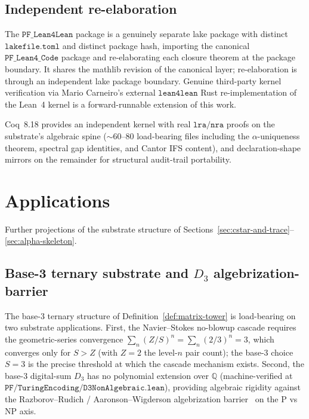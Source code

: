 \documentclass[11pt,a4paper]{amsart}
\theoremstyle{plain}
\theoremstyle{definition}
\begin{document}
\subsection{Independent re-elaboration}

The $\texttt{PF\_Lean4Lean}$ package is a genuinely separate lake package with distinct $\texttt{lakefile.toml}$ and distinct package hash, importing the canonical $\texttt{PF\_Lean4\_Code}$ package and re-elaborating each closure theorem at the package boundary. It shares the mathlib revision of the canonical layer; re-elaboration is through an independent lake package boundary. Genuine third-party kernel verification via Mario Carneiro's external $\texttt{lean4lean}$ Rust re-implementation of the Lean~4 kernel is a forward-runnable extension of this work.

Coq~8.18 provides an independent kernel with real $\texttt{lra}/\texttt{nra}$ proofs on the substrate's algebraic spine ($\sim 60$--$80$ load-bearing files including the $\alpha$-uniqueness theorem, spectral gap identities, and Cantor IFS content), and declaration-shape mirrors on the remainder for structural audit-trail portability.

\section{Applications}\label{sec:applications}

Further projections of the substrate structure of Sections~\ref{sec:cstar-and-trace}--\ref{sec:alpha-skeleton}.

\subsection{Base-3 ternary substrate and $D_{3}$ algebrization-barrier}

The base-3 ternary structure of Definition~\ref{def:matrix-tower} is load-bearing on two substrate applications. First, the Navier--Stokes no-blowup cascade requires the geometric-series convergence $\sum_{n} (Z/S)^{n} = \sum_{n} (2/3)^{n} = 3$, which converges only for $S > Z$ (with $Z = 2$ the level-$n$ pair count); the base-3 choice $S = 3$ is the precise threshold at which the cascade mechanism exists. Second, the base-3 digital-sum $D_{3}$ has no polynomial extension over $\mathbb{Q}$ (machine-verified at $\texttt{PF/TuringEncoding/D3NonAlgebraic.lean}$), providing algebraic rigidity against the Razborov--Rudich / Aaronson--Wigderson algebrization barrier~\cite{aaronson-wigderson2009} on the P vs NP axis.
\end{document}
